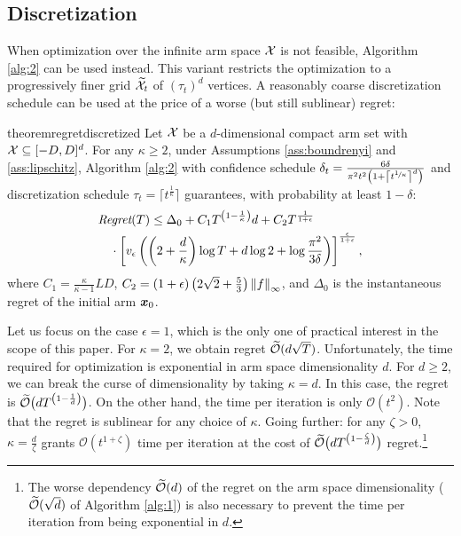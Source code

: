 \documentclass{article}
\begin{document}
\subsection{Discretization}
When optimization over the infinite arm space $\Xspace$ is not feasible, Algorithm \ref{alg:2} can be used instead. This variant restricts the optimization to a progressively finer grid $\wt{\Xspace}_t$ of $(\tau_t)^d$ vertices. A reasonably coarse discretization schedule can be used at the price of a worse (but still sublinear) regret:
%
\begin{restatable}{theorem}{regretdiscretized}\label{th:regretdiscretized}
	Let $\Xspace$ be a $d$-dimensional compact arm set with $\Xspace \subseteq [-D,D]^d$. For any $\kappa\geq2$, under Assumptions \ref{ass:boundrenyi} and \ref{ass:lipschitz}, Algorithm \ref{alg:2} with confidence schedule ${\delta_t = \frac{6\delta}{\pi^2t^2\left(1+\left\lceil t^{\nicefrac{1}{\kappa}}\right\rceil^d\right)}}$ and discretization schedule $\tau_t=\lceil t^{\frac{1}{\kappa}} \rceil$ guarantees, with probability at least $1-\delta$:
	\begin{align*}
	&\Reg(T) \leq \Delta_0  + C_1T^{\left(1-\frac{1}{\kappa}\right)}d
	+ C_2
	T^{\frac{1}{1+\epsilon}} %
	\\&\quad\cdot\left[v_{\epsilon}
	\left(\left(2+ \frac{d}{\kappa}\right)\log T + d\log 2 + \log\frac{\pi^2}{3\delta}\right)\right]^{\frac{\epsilon}{1+\epsilon}},
	\end{align*}
	where $C_1=\frac{\kappa}{\kappa-1}LD$, $C_2=(1+\epsilon)\left(2\sqrt{2}+\frac{5}{3}\right)\norm[\infty]{f}$, and $\Delta_0$ is the instantaneous regret of the initial arm $\vx_0$.
\end{restatable}
%
Let us focus on the case $\epsilon=1$, which is the only one of practical interest in the scope of this paper.
For $\kappa=2$, we obtain regret $\wt{\mathcal{O}}(d\sqrt{T})$. Unfortunately, the time required for optimization is exponential in arm space dimensionality $d$. For $d\geq 2$, we can break the curse of dimensionality by taking $\kappa=d$. In this case, the regret is $\wt{\mathcal{O}}\big(dT^{\left(1-\frac{1}{d}\right)}\big)$. On the other hand, the time per iteration is only ${\mathcal{O}}(t^2)$. Note that the regret is sublinear for any choice of $\kappa$. 
Going further: for any $\zeta>0$, $\kappa=\frac{d}{\zeta}$ grants ${\mathcal{O}}(t^{1+\zeta})$ time per iteration at the cost of $\wt{\mathcal{O}}\big(dT^{\left(1-\frac{\zeta}{d}\right)}\big)$ regret.\footnote{The worse dependency $\wt{\mathcal{O}}(d)$ of the regret on the arm space dimensionality (\wrt $\wt{\mathcal{O}}(\sqrt{d})$ of Algorithm \ref{alg:1}) is also necessary to prevent the time per iteration from being exponential in $d$.}
\end{document}
